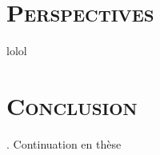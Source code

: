 \section{\scshape Perspectives}
\begin{frame}
	lolol
\end{frame}

\section{\scshape Conclusion}
\begin{frame}
	. Continuation en thèse
	
\end{frame}